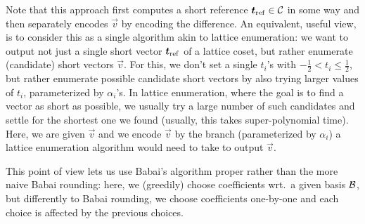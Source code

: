 \begin{remark}
Note that this approach first computes a short reference $\boldsymbol{t}_{\mathrm{ref}}\in\mathcal{C}$ in some way and then separately encodes $\vec{v}$ by encoding the difference.
An equivalent, useful view, is to consider this as a single algorithm akin to lattice enumeration: we want to output not just a single short vector $\boldsymbol{t}_{\mathrm{ref}}$ of a lattice coset, but rather enumerate (candidate) short vectors $\vec{v}$. For this, we don't set a single $t_i$'s with $-\tfrac12 < t_i \leq \tfrac12$, but rather enumerate possible candidate short vectors by also trying larger values of $t_i$, parameterized by $\alpha_i$'s. In lattice enumeration, where the goal is to find a vector as short as possible, we usually try a large number of such candidates and settle for the shortest one we found (usually, this takes super-polynomial time). Here, we are given $\vec{v}$ and we encode $\vec{v}$ by the branch (parameterized by $\alpha_i$) a lattice enumeration algorithm would need to take to output $\vec{v}$.

This point of view lets us use Babai's algorithm proper rather than the more naive Babai rounding: here, we (greedily) choose coefficients wrt.\ a given basis $\mathcal{B}$, but differently to Babai rounding, we choose coefficients one-by-one and
each choice is affected by the previous choices.


\end{remark}
